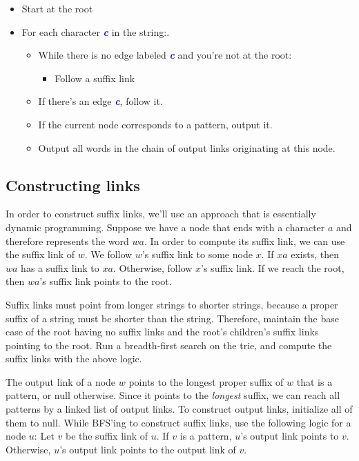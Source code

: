 \documentclass[11pt, oneside]{article}
\newcommand{\emphasis}[1]{\textcolor{blue}{\textbf{\textit{#1}}}}
\begin{document}
\begin{itemize}
    \item Start at the root
    \item For each character \emphasis{c} in the string:.
      \begin{itemize}
        \item While there is no edge labeled \emphasis{c} and you're not at the root:
          \begin{itemize}
            \item Follow a suffix link
          \end{itemize}
        \item If there's an edge \emphasis{c}, follow it.
        \item If the current node corresponds to a pattern, output it.
        \item Output all words in the chain of output links originating at this node.
      \end{itemize}
\end{itemize}

\newpage

\subsection{Constructing links}

In order to construct suffix links, we'll use an approach that is essentially dynamic programming.
Suppose we have a node that ends with a character \( a \) and therefore represents the word \( wa \).
In order to compute its suffix link, we can use the suffix link of \( w \).
We follow \( w \)'s suffix link to some node \( x \). If \( xa \) exists, then \( wa \) has a suffix link
to \( xa \). Otherwise, follow \( x \)'s suffix link. If we reach the root,
then \( wa \)'s suffix link points to the root.

Suffix links must point from longer strings to shorter strings, because a proper suffix of a string
must be shorter than the string. Therefore, maintain the base case of the root having no suffix links
and the root's children's suffix links pointing to the root. Run a breadth-first search on the trie,
and compute the suffix links with the above logic.

The output link of a node \( w \) points to the longest proper suffix of \( w \) that is a pattern,
or null otherwise. Since it points to the \textit{longest} suffix, we can reach all patterns
by a linked list of output links. To construct output links, initialize all of them to null.
While BFS'ing to construct suffix links, use the following logic for a node \( u \):
Let \( v \) be the suffix link of \( u \). If \( v \) is a pattern, \( u \)'s output link
points to \( v \). Otherwise, \( u \)'s output link points to the output link of \( v \).
\end{document}
